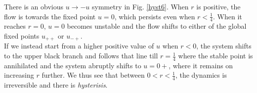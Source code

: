 \noindent
There is an obvious $u\to -u$ symmetry in Fig. \ref{hyst6}. When $r$ is positive, the flow is towards the fixed point $u=0$, which persists even when $r<\frac{1}{4}$. When it reaches $r=0$, $u=0$ becomes unstable and the flow shifts to either of the global fixed points $u_{++}$ or $u_{-+}$.\\[0.2cm] If we instead start from a higher positive value of $u$ when $r<0$, the system shifts to the upper black branch and follows that line till $r=\frac{1}{4}$ where the stable point is annihilated and the system abruptly shifts to $u=0+$, where it remains on increasing $r$ further. We thus see that between $0<r<\frac{1}{4}$, the dynamics is irreversible and there is \textit{hysterisis}. 